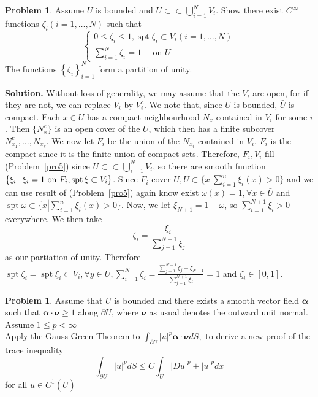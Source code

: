 \documentclass[a4paper]{book}
\newenvironment{solution}%
{\noindent\textbf{Solution.}}%
{\qedhere}
\numberwithin{equation}{chapter}
\theoremstyle{definition}
\newtheorem{pro}[exm]{Problem}
\begin{document}
\begin{pro}
  Assume $U$ is bounded and $U \subset \subset\bigcup_{i=1}^{N} V_{i} .$ Show there exist $C^{\infty}$ functions $\zeta_{i}(i=1, \ldots, N)$ such that
  \[
    \left\{
      \begin{array}{l}
        0 \leq \zeta_{i} \leq 1, \operatorname{spt} \zeta_{i} \subset V_{i}(i=1, \ldots, N) \\
        \sum_{i=1}^{N} \zeta_{i}=1 \quad \text { on } U
      \end{array}\right.
  \]
  The functions $\left\{\zeta_{i}\right\}_{i=1}^{N}$ form a partition of unity.
\end{pro}

\begin{solution}
  Without loss of generality, we may assume that the $V_i$ are open, for if they are not, we can replace $V_i$ by $V_i^c$. We note that, since $U$ is bounded, $\bar{U}$ is compact. Each $x \in U$ has a compact neighbourhood $N_x$ contained in $V_i$ for some $i$. Then $\{N_x^c\}$ is an open cover of the $\bar{U}$, which then has a finite subcover $N_{x_1}^c, \ldots , N_{x_k}$. We now let $F_i$ be the union of the $N_{x_i}$ contained in $V_i$. $F_i$ is the compact since it is the finite union of compact sets. Therefore, $F_i,V_i$ fill (Problem~\ref{pro5}) since $U \subset \subset \bigcup_{i=1}^{N} V_{i} $, so there are smooth function $\{\xi_i \left.\right| \xi_i = 1 \textmd{ on } F_i, \operatorname{spt} \xi \subset V_i\}$. Since $F_i$ cover $U, U \subset \{x \left.\right| \sum_{i =1}^n \xi_i(x) > 0\}$ and we can use result of (Problem~\ref{pro5}) again know exist $\omega(x) = 1, \forall x \in \bar{U}$ and $\operatorname{spt} \omega \subset \{x \left.\right| \sum_{i =1}^n \xi_i(x) > 0\}$. Now, we let $\xi_{N+1}= 1 - \omega$, so $\sum_{i=1}^{N+1} \xi_i > 0$ everywhere. We then take
  \[\zeta_i = \frac{\xi_i}{\sum_{j=1}^{N+1}\xi_j}\]
  as our partiation of unity. Therefore $\operatorname{spt} \zeta_i = \operatorname{spt} \xi_i \subset V_i, \forall y \in \bar{U}, \sum_{i=1}^N \zeta_i = \frac{\sum_{j=1}^{N+1} \xi_j - \xi_{N+1}}{\sum_{j=1}^{N+1} \xi_j} = 1$ and $\zeta_i \in [0,1]$.
\end{solution}

\begin{pro}
  Assume that $U$ is bounded and there exists a smooth vector field $\boldsymbol{\alpha}$ such that $\boldsymbol{\alpha} \cdot \boldsymbol{\nu} \geq 1$ along $\partial U$, where $\boldsymbol{\nu}$ as usual denotes the outward unit normal. Assume $1 \leq p<\infty$ \\
  Apply the Gauss-Green Theorem to $\int_{\partial U}|u|^{p} \boldsymbol{\alpha} \cdot \boldsymbol{\nu} d S,$ to derive a new proof of the trace inequality
  \[
    \int_{\partial U}|u|^{p} d S \leq C \int_{U}|D u|^{p}+|u|^{p} d x
  \]
  for all $u \in C^{1}(\bar{U})$
\end{pro}
\end{document}
